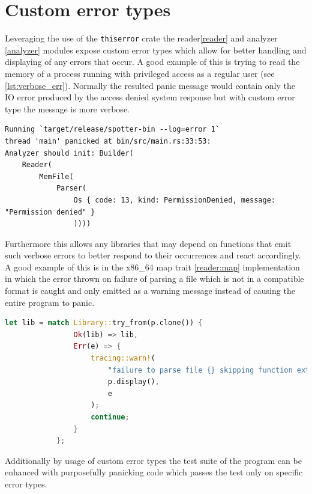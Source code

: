 \section{Custom error types}

Leveraging the use of the \verb|thiserror| crate \cite{tolnay_dtolnaythiserror_2024} the reader\ref{reader} and analyzer \ref{analyzer} modules expose custom error types which allow for better handling and displaying of any errors that occur. 
A good example of this is trying to read the memory of a process running with privileged access as a regular user (see \ref{lst:verbose_err}). Normally the resulted panic message would contain only the IO error produced by the access denied system response but with custom error type the message is more verbose.

\begin{lstlisting}[caption=\label{lst:verbose_err}"Error when trying to read the pid 1 process"]
Running `target/release/spotter-bin --log=error 1`
thread 'main' panicked at bin/src/main.rs:33:53:
Analyzer should init: Builder(
    Reader(
        MemFile(
            Parser(
                Os { code: 13, kind: PermissionDenied, message: "Permission denied" }
                ))))
\end{lstlisting}

Furthermore this allows any libraries that may depend on functions that emit such verbose errors to better respond to their occurrences and react accordingly. 
A good example of this is in the x86\_64 map trait \ref{reader:map} implementation in which the error thrown on failure of parsing a file which is not in a compatible format is caught and only emitted as a warning message instead of causing the entire program to panic.

\begin{lstlisting}[caption=\label{lst:err_handling}"Customm error handling example", language=Rust]
let lib = match Library::try_from(p.clone()) {
                Ok(lib) => lib,
                Err(e) => {
                    tracing::warn!(
                        "failure to parse file {} skipping function extraction ({})",
                        p.display(),
                        e
                    );
                    continue;
                }
            };
\end{lstlisting}

Additionally by usage of custom error types the test suite of the program can be enhanced with purposefully panicking code which passes the test only on specific error types.


